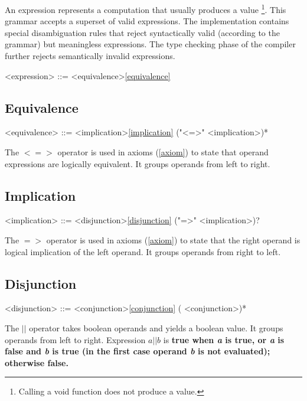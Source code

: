 \documentclass[a4paper,oneside,11pt]{article}
\begin{document}
An expression represents a computation that usually produces a value \footnote{Calling a void function does not produce a value.}.
This grammar accepts a superset of valid expressions. The implementation contains special disambiguation rules that reject syntactically
valid (according to the grammar) but meaningless expressions.
The type checking phase of the compiler further rejects semantically invalid expressions.

\begin{grammar}
\label{expression}<expression> ::= <equivalence>\ref{equivalence}
\end{grammar}

\subsection{Equivalence}

\begin{grammar}
\label{equivalence}<equivalence> ::= <implication>\ref{implication} ("<=>" <implication>)*
\end{grammar}

The $<=>$ operator is used in axioms (\ref{axiom}) to state that operand expressions are logically equivalent.
It groups operands from left to right.

\subsection{Implication}

\begin{grammar}
\label{implication}<implication> ::= <disjunction>\ref{disjunction} ("=>" <implication>)?
\end{grammar}

The $=>$ operator is used in axioms (\ref{axiom}) to state that the right operand is logical implication of the left
operand. It groups operands from right to left.

\subsection{Disjunction}

\begin{grammar}
\label{disjunction}<disjunction> ::= <conjunction>\ref{conjunction} (\lit*{||} <conjunction>)*
\end{grammar}

The $||$ operator takes boolean operands and yields a boolean value. It groups operands from left to right.
Expression $a || b$ is \bf{true} when \emph{a} is \bf{true}, or \emph{a} is \bf{false} and \emph{b} is \bf{true}
(in the first case operand \emph{b} is not evaluated); otherwise \bf{false}.
\end{document}
